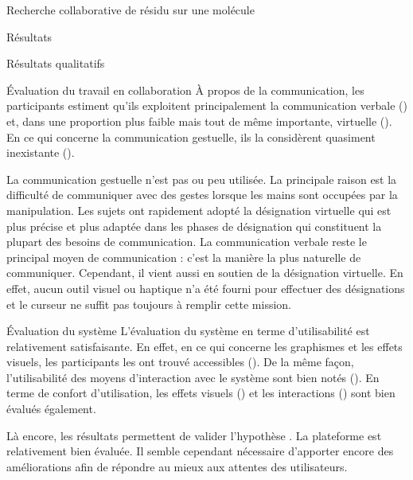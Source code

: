 \documentclass[myfrancais,ngerman,english,french]{mythesis}
\begin{document}
\begin{mychapter}{Recherche collaborative de résidu sur une molécule}
\begin{mysection}{Résultats}
\begin{mysubsection}{Résultats qualitatifs}
\begin{mysubsubsection}{Évaluation du travail en collaboration}
					À propos de la communication, les participants estiment qu'ils exploitent principalement la communication verbale () et, dans une proportion plus faible mais tout de même importante, virtuelle ().
					En ce qui concerne la communication gestuelle, ils la considèrent quasiment inexistante ().

					La communication gestuelle n'est pas ou peu utilisée.
					La principale raison est la difficulté de communiquer avec des gestes lorsque les mains sont occupées par la manipulation.
					Les sujets ont rapidement adopté la désignation virtuelle qui est plus précise et plus adaptée dans les phases de désignation qui constituent la plupart des besoins de communication.
					La communication verbale reste le principal moyen de communication : c'est la manière la plus naturelle de communiquer.
					Cependant, il vient aussi en soutien de la désignation virtuelle.
					En effet, aucun outil visuel ou haptique n'a été fourni pour effectuer des désignations et le curseur ne suffit pas toujours à remplir cette mission.
				\end{mysubsubsection}
				\begin{mysubsubsection}{Évaluation du système}
					L'évaluation du système en terme d'utilisabilité est relativement satisfaisante.
					En effet, en ce qui concerne les graphismes et les effets visuels, les participants les ont trouvé accessibles ().
					De la même façon, l'utilisabilité des moyens d'interaction avec le système sont bien notés ().
					En terme de confort d'utilisation, les effets visuels () et les interactions () sont bien évalués également.

					Là encore, les résultats permettent de valider l'hypothèse .
					La plateforme est relativement bien évaluée.
					Il semble cependant nécessaire d'apporter encore des améliorations afin de répondre au mieux aux attentes des utilisateurs.


\end{mysubsubsection}
\end{mysubsection}
\end{mysection}
\end{mychapter}
\end{document}

